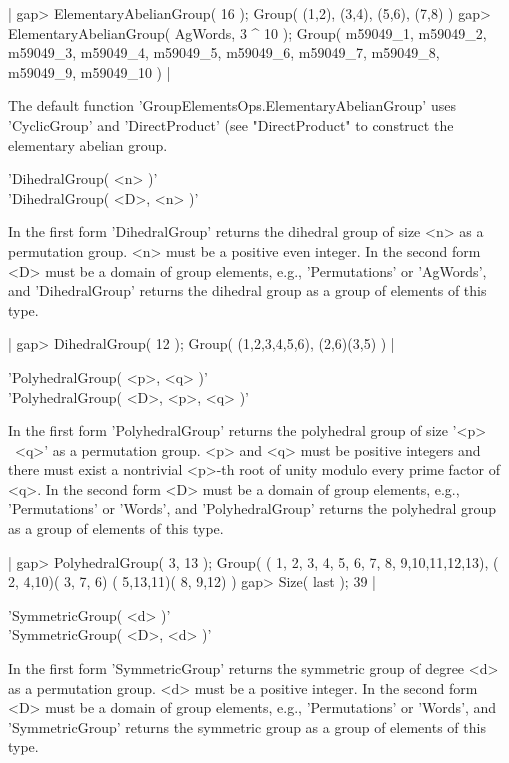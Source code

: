 |    gap> ElementaryAbelianGroup( 16 );
    Group( (1,2), (3,4), (5,6), (7,8) )
    gap> ElementaryAbelianGroup( AgWords, 3 ^ 10 );
    Group( m59049_1, m59049_2, m59049_3, m59049_4, m59049_5, m59049_6,
    m59049_7, m59049_8, m59049_9, m59049_10 ) |

The  default    function  'GroupElementsOps.ElementaryAbelianGroup'  uses
'CyclicGroup'  and 'DirectProduct'  (see "DirectProduct" to construct the
elementary abelian group.

\vspace{5mm}
'DihedralGroup( <n> )'%
 \\
'DihedralGroup( <D>, <n> )'

In  the first form 'DihedralGroup' returns the dihedral group of size <n>
as a permutation group.   <n> must be a positive  even  integer.   In the
second form  <D> must be a domain of group elements, e.g., 'Permutations'
or 'AgWords', and 'DihedralGroup'  returns the dihedral group  as a group
of elements of this type.

|    gap> DihedralGroup( 12 );
    Group( (1,2,3,4,5,6), (2,6)(3,5) ) |

\vspace{5mm}
'PolyhedralGroup( <p>, <q> )'%
 \\
'PolyhedralGroup( <D>, <p>, <q> )'

In the  first form 'PolyhedralGroup' returns the polyhedral group of size
'<p> \*\  <q>'  as a  permutation group.   <p> and  <q> must  be positive
integers and there must exist a  nontrivial <p>-th root  of  unity modulo
every prime factor  of <q>.  In the  second form <D> must be a domain  of
group  elements,  e.g., 'Permutations' or  'Words', and 'PolyhedralGroup'
returns the polyhedral group as a group of elements of this type.

|    gap> PolyhedralGroup( 3, 13 );
    Group( ( 1, 2, 3, 4, 5, 6, 7, 8, 9,10,11,12,13), ( 2, 4,10)( 3, 7, 6)
    ( 5,13,11)( 8, 9,12) )
    gap> Size( last );
    39 |

\vspace{5mm}
'SymmetricGroup( <d> )'%
 \\
'SymmetricGroup( <D>, <d> )'

In the first form 'SymmetricGroup' returns the symmetric group of  degree
<d>  as  a  permutation group.   <d>  must be a positive integer.  In the
second form <D>  must be a domain of group elements, e.g., 'Permutations'
or 'Words',  and 'SymmetricGroup' returns the symmetric group as a  group
of elements of this type.

